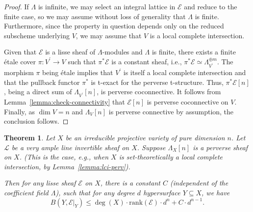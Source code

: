 \documentclass[english]{smfart}
\renewcommand{\leq}{\leqslant}
\renewcommand{\geq}{\geqslant}
\renewcommand{\subset}{\subseteq}
\theoremstyle{remark}
\theoremstyle{plain}
\newtheorem{theorem}[remark]{Theorem}
\newtheorem{lemma}[remark]{Lemma}
\theoremstyle{definition}
\numberwithin{equation}{remark}
\theoremstyle{void}
\begin{document}
\begin{proof}
If \(\Lambda\) is infinite, we may select an integral lattice in
\(\mathcal{E}\) and reduce to the finite case, so we may assume
without loss of generality that \(\Lambda\) is finite.  Furthermore,
since the property in question depends only on the reduced subscheme
underlying \(V\), we may assume that \(V\) is a local complete
intersection.

Given that \(\mathcal{E}\) is a lisse sheaf of \(\Lambda\)-modules
and \(\Lambda\) is finite, there exists a finite étale cover
\(\pi\colon V^{\prime} \to V\) such that \(\pi^*\mathcal{E}\) is a
constant sheaf, i.e.,
\(\pi^*\mathcal{E} \simeq \Lambda_{V^{\prime}}^{\oplus m}\).  The
morphism \(\pi\) being étale implies that \(V^{\prime}\) is itself a
local complete intersection and that the pullback functor \(\pi^*\) is
t-exact for the perverse t-structure.  Thus, \(\pi^*\mathcal{E}[n]\),
being a direct sum of \(\Lambda_{V^{\prime}}[n]\), is perverse
coconnective.  It follows from Lemma~\ref{lemma:check-connectivity}
that \(\mathcal{E}[n]\) is perverse coconnective on \(V\).  Finally,
as \(\dim V = n\) and \(\Lambda_V[n]\) is perverse connective by
assumption, the conclusion follows.
\end{proof}

\begin{theorem}\label{theorem:lci}
Let \(X\) be an irreducible projective variety of pure dimension
\(n\).  Let \(\mathscr{L}\) be a very ample line invertible sheaf on
\(X\).  Suppose \(\Lambda_X[n]\) is a perverse sheaf on \(X\).  (This
is the case, e.g., when \(X\) is set-theoretically a local complete
intersection, by Lemma~\ref{lemma:lci-perv}).

Then for any lisse sheaf \(\mathcal{E}\) on \(X\), there is a constant \(C\) (independent of the coefficient field
\(\Lambda\)), such that for any degree \(d\) hypersurface
\(Y \subset X\), we have
\[
B(Y, \mathcal{E}|_{Y}) \leq \deg(X) \cdot \mathrm{rank}(\mathcal{E}) \cdot d^n + C\cdot d^{n-1}.
\]
\end{theorem}



\end{document}
